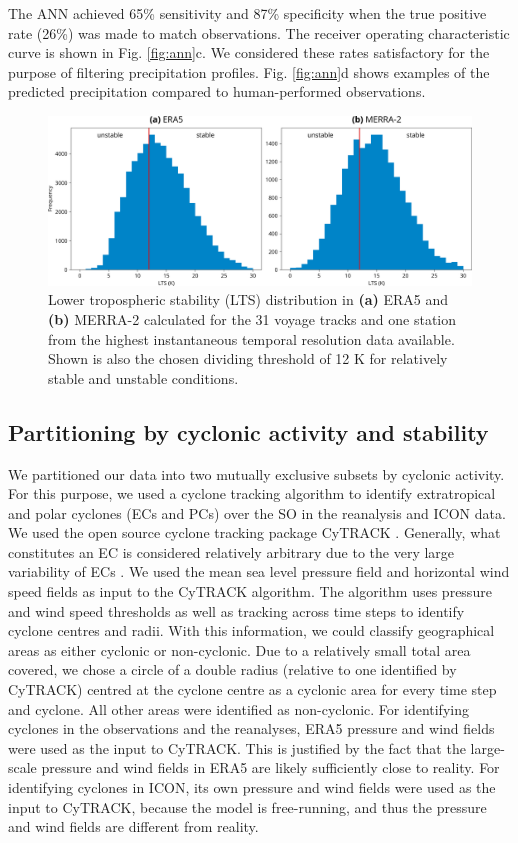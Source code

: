 \documentclass[12pt,a4paper]{article}
\begin{document}
The ANN achieved 65\% sensitivity and 87\% specificity when the true positive
rate (26\%) was made to match observations. The receiver operating
characteristic curve is shown in Fig. \ref{fig:ann}c. We considered these rates
satisfactory for the purpose of filtering precipitation profiles. Fig.
\ref{fig:ann}d shows examples of the predicted precipitation compared to
human-performed observations.

\begin{figure}[b!]
\centering
\includegraphics[width=\textwidth]{img/lts_dist.pdf}
\caption{
Lower tropospheric stability (LTS) distribution in \textbf{(a)} ERA5 and
\textbf{(b)} MERRA-2 calculated for the 31 voyage tracks and one station from
the highest instantaneous temporal resolution data available. Shown is also the
chosen dividing threshold of 12 K for relatively stable and unstable
conditions.
}
\label{fig:lts}
\end{figure}

\subsection{Partitioning by cyclonic activity and stability}
\label{sec:cyclone-stability}

We partitioned our data into two mutually exclusive subsets by cyclonic
activity. For this purpose, we used a cyclone tracking algorithm to identify
extratropical and polar cyclones (ECs and PCs) over the SO in the reanalysis
and ICON data. We used the open source cyclone tracking package CyTRACK
\citep{perez-alarcon2024}.  Generally, what constitutes an EC is considered
relatively arbitrary due to the very large variability of ECs \citep{neu2013}.
We used the mean sea level pressure field and horizontal wind speed fields as
input to the CyTRACK algorithm. The algorithm uses pressure and wind speed
thresholds as well as tracking across time steps to identify cyclone centres
and radii. With this information, we could classify geographical areas as
either cyclonic or non-cyclonic. Due to a relatively small total area covered,
we chose a circle of a double radius (relative to one identified by CyTRACK)
centred at the cyclone centre as a cyclonic area for every time step and
cyclone. All other areas were identified as non-cyclonic. For identifying
cyclones in the observations and the reanalyses, ERA5 pressure and wind fields
were used as the input to CyTRACK.  This is justified by the fact that the
large-scale pressure and wind fields in ERA5 are likely sufficiently close to
reality. For identifying cyclones in ICON, its own pressure and wind fields
were used as the input to CyTRACK, because the model is free-running, and thus
the pressure and wind fields are different from reality.
\end{document}
